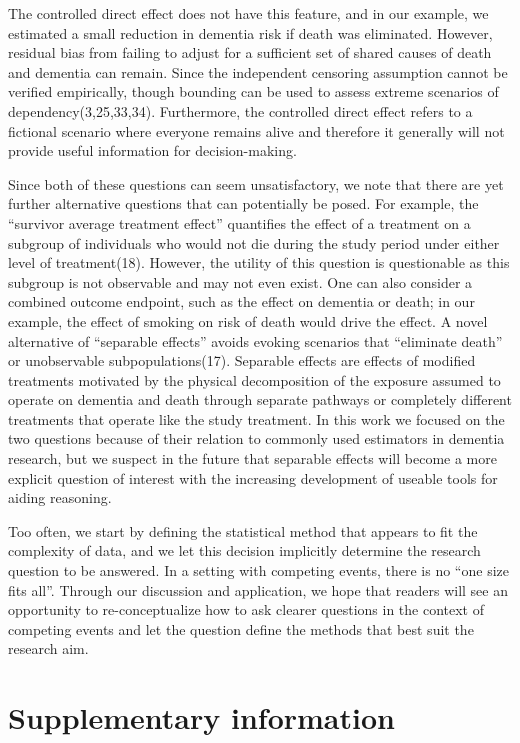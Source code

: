 \documentclass[
]{book}
\begin{document}
The controlled direct effect does not have this feature, and in our example, we estimated a small reduction in dementia risk if death was eliminated. However, residual bias from failing to adjust for a sufficient set of shared causes of death and dementia can remain. Since the independent censoring assumption cannot be verified empirically, though bounding can be used to assess extreme scenarios of dependency(3,25,33,34). Furthermore, the controlled direct effect refers to a fictional scenario where everyone remains alive and therefore it generally will not provide useful information for decision-making.

Since both of these questions can seem unsatisfactory, we note that there are yet further alternative questions that can potentially be posed. For example, the ``survivor average treatment effect'' quantifies the effect of a treatment on a subgroup of individuals who would not die during the study period under either level of treatment(18). However, the utility of this question is questionable as this subgroup is not observable and may not even exist. One can also consider a combined outcome endpoint, such as the effect on dementia or death; in our example, the effect of smoking on risk of death would drive the effect. A novel alternative of ``separable effects'' avoids evoking scenarios that ``eliminate death'' or unobservable subpopulations(17). Separable effects are effects of modified treatments motivated by the physical decomposition of the exposure assumed to operate on dementia and death through separate pathways or completely different treatments that operate like the study treatment. In this work we focused on the two questions because of their relation to commonly used estimators in dementia research, but we suspect in the future that separable effects will become a more explicit question of interest with the increasing development of useable tools for aiding reasoning.

Too often, we start by defining the statistical method that appears to fit the complexity of data, and we let this decision implicitly determine the research question to be answered. In a setting with competing events, there is no ``one size fits all''. Through our discussion and application, we hope that readers will see an opportunity to re-conceptualize how to ask clearer questions in the context of competing events and let the question define the methods that best suit the research aim.

\hypertarget{supplementary-information-3}{%
\section{Supplementary information}\label{supplementary-information-3}}
\end{document}
